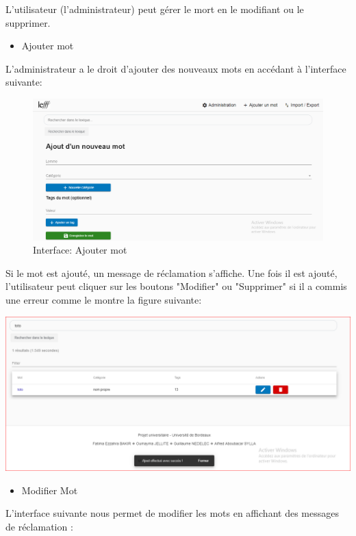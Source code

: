 \documentclass[12pt,a4paper]{article}
\begin{document}
L’utilisateur (l’administrateur) peut gérer le mort en le modifiant ou le supprimer.


\begin{itemize}  
  \item Ajouter mot
\end{itemize}

L'administrateur a le droit d'ajouter des nouveaux mots  en accédant à l'interface suivante: 


\begin{figure}[!b]
\centering
\includegraphics{img/Ajoutermot.PNG}
\caption{Interface: Ajouter mot}
\label{Tux}
\end{figure}


Si le mot  est ajouté, un message de réclamation s'affiche. Une fois il est ajouté, l'utilisateur peut cliquer sur les boutons "Modifier" ou "Supprimer" si il a commis une erreur comme le montre la figure suivante:


\includegraphics[width=150mm]{img/AjoutEffectuer.PNG}


\begin{itemize}  
  \item Modifier Mot
\end{itemize}
L'interface suivante nous permet de modifier les mots en affichant des messages de réclamation : 
\end{document}
